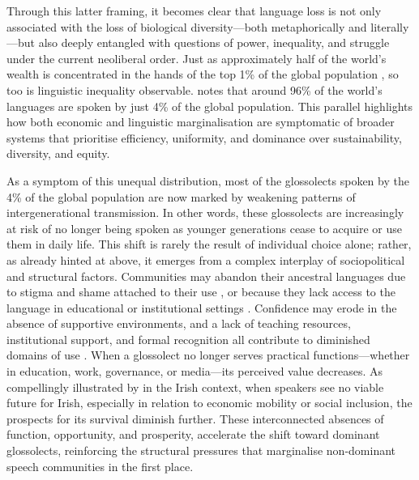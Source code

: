 \documentclass[a4paper,11pt]{article}
\begin{document}
Through this latter framing, it becomes clear that language loss is not only associated with the loss of biological diversity—both metaphorically and literally—but also deeply entangled with questions of power, inequality, and struggle under the current neoliberal order. Just as approximately half of the world’s wealth is concentrated in the hands of the top 1\% of the global population \citep{zucman2019global}, so too is linguistic inequality observable. \citet{crystal2002language} notes that around 96\% of the world’s languages are spoken by just 4\% of the global population. This parallel highlights how both economic and linguistic marginalisation are symptomatic of broader systems that prioritise efficiency, uniformity, and dominance over sustainability, diversity, and equity.

As a symptom of this unequal distribution, most of the glossolects spoken by the 4\% of the global population are now marked by weakening patterns of intergenerational transmission. In other words, these glossolects are increasingly at risk of no longer being spoken as younger generations cease to acquire or use them in daily life. This shift is rarely the result of individual choice alone; rather, as already hinted at above, it emerges from a complex interplay of sociopolitical and structural factors. Communities may abandon their ancestral languages due to stigma and shame attached to their use \citep{sallabank2013attitudes}, or because they lack access to the language in educational or institutional settings \citep{tsunoda2006language}. Confidence may erode in the absence of supportive environments, and a lack of teaching resources, institutional support, and formal recognition all contribute to diminished domains of use \citep{austin2011cambridge}. When a glossolect no longer serves practical functions—whether in education, work, governance, or media—its perceived value decreases. As compellingly illustrated by \citet{oceallaigh2022neoliberalism} in the Irish context, when speakers see no viable future for Irish, especially in relation to economic mobility or social inclusion, the prospects for its survival diminish further. These interconnected absences of function, opportunity, and prosperity, accelerate the shift toward dominant glossolects, reinforcing the structural pressures that marginalise non-dominant speech communities in the first place.
\end{document}
